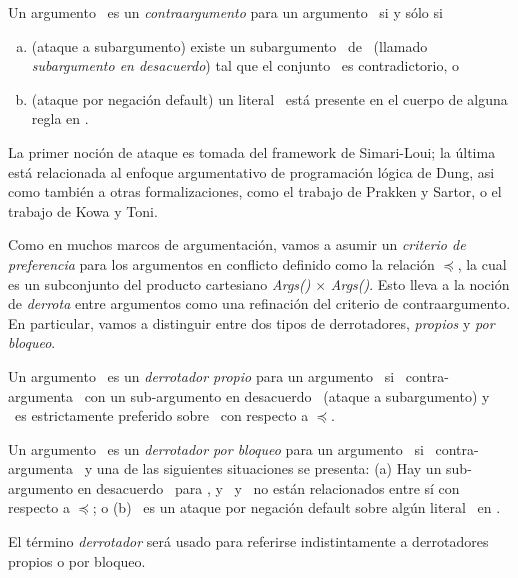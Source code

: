  \begin{definicion}
 \label{def:contraargumento}
 
 Un argumento \AaQa\ es un \textit{contraargumento} para un argumento
 \AbQb\ si y sólo si
 
 \begin{enumerate}[a)]
 
 \item (ataque a subargumento) existe un subargumento \AQ\ de \AbQb\ 
 (llamado \textit{subargumento en desacuerdo}) tal que el conjunto 
 \SyQaQ\ es contradictorio, o
 
 \item (ataque por negación default) un literal \negda{\ArgQa}\ está
 presente en el cuerpo de alguna  regla en \ArgAb.
 
 \end{enumerate}  
 \end{definicion}
 
 La primer noción de ataque es tomada del framework de Simari-Loui; la
 última está relacionada al  enfoque argumentativo de programación
 lógica de Dung, asi como también a otras formalizaciones, como el
 trabajo de Prakken y Sartor, o el trabajo de Kowa y Toni.
 
 Como en muchos marcos de argumentación, vamos a asumir un
 \textit{criterio de preferencia} para los  argumentos en conflicto
 definido como la relación $\preceq$, la cual es un subconjunto del
 producto  cartesiano \textit{Args(\PP)} $\times$ \textit{Args(\PP)}.
 Esto lleva a la noción de \textit{derrota} entre argumentos como una
 refinación del criterio de contraargumento. En particular, vamos a
 distinguir entre  dos tipos de derrotadores, \textit{propios} y
 \textit{por bloqueo}.
 
 \begin{definicion}
 \label{def:derrotadores}
 
 Un argumento \AaQa\ es un \textit{derrotador propio} para un argumento
 \AbQb\ si \AaQa\ contra-argumenta \AbQb\ con un sub-argumento en
 desacuerdo \AQ\ (ataque a subargumento) y \AaQa\ es estrictamente
 preferido sobre \AQ\ con respecto a $\preceq$.
 
 Un argumento \AaQa\ es un \textit{derrotador por bloqueo} para un
 argumento \AbQb\ si \AaQa\ contra-argumenta \AbQb\ y una de las
 siguientes situaciones se presenta: (a) Hay un sub-argumento en
 desacuerdo \AQ\ para \AbQb, y \AaQa\ y \AQ\ no están relacionados
 entre sí con respecto a $\preceq$; o (b) \AaQa\ es un ataque  por
 negación default sobre algún literal \negda{\ArgQa}\ en \AbQb.
 
 El término \textit{derrotador} será usado para referirse
 indistintamente a derrotadores propios o por bloqueo.
 \end{definicion}
 
